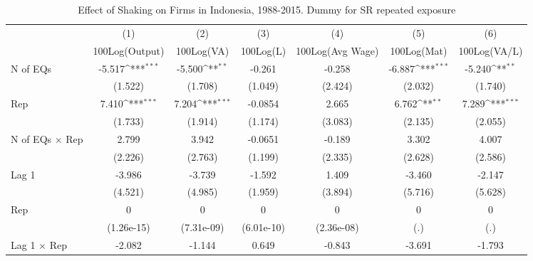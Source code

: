 \begin{table}[htbp]\centering
\def\sym#1{\ifmmode^{#1}\else\(^{#1}\)\fi}
\caption{Effect of Shaking on Firms in Indonesia, 1988-2015. Dummy for SR repeated exposure}
\begin{tabular}{l*{6}{c}}
\toprule
                &\multicolumn{1}{c}{(1)}&\multicolumn{1}{c}{(2)}&\multicolumn{1}{c}{(3)}&\multicolumn{1}{c}{(4)}&\multicolumn{1}{c}{(5)}&\multicolumn{1}{c}{(6)}\\
                &\multicolumn{1}{c}{100Log(Output)}&\multicolumn{1}{c}{100Log(VA)}&\multicolumn{1}{c}{100Log(L)}&\multicolumn{1}{c}{100Log(Avg Wage)}&\multicolumn{1}{c}{100Log(Mat)}&\multicolumn{1}{c}{100Log(VA/L)}\\
\midrule
N of EQs        &   -5.517\sym{***}&   -5.500\sym{**} &   -0.261         &   -0.258         &   -6.887\sym{***}&   -5.240\sym{**} \\
                &  (1.522)         &  (1.708)         &  (1.049)         &  (2.424)         &  (2.032)         &  (1.740)         \\
\addlinespace
Rep             &    7.410\sym{***}&    7.204\sym{***}&  -0.0854         &    2.665         &    6.762\sym{**} &    7.289\sym{***}\\
                &  (1.733)         &  (1.914)         &  (1.174)         &  (3.083)         &  (2.135)         &  (2.055)         \\
\addlinespace
N of EQs $\times$ Rep&    2.799         &    3.942         &  -0.0651         &   -0.189         &    3.302         &    4.007         \\
                &  (2.226)         &  (2.763)         &  (1.199)         &  (2.335)         &  (2.628)         &  (2.586)         \\
\addlinespace
Lag 1           &   -3.986         &   -3.739         &   -1.592         &    1.409         &   -3.460         &   -2.147         \\
                &  (4.521)         &  (4.985)         &  (1.959)         &  (3.894)         &  (5.716)         &  (5.628)         \\
\addlinespace
Rep             &        0         &        0         &        0         &        0         &        0         &        0         \\
                &(1.26e-15)         &(7.31e-09)         &(6.01e-10)         &(2.36e-08)         &      (.)         &      (.)         \\
\addlinespace
Lag 1 $\times$ Rep&   -2.082         &   -1.144         &    0.649         &   -0.843         &   -3.691         &   -1.793         \\

\end{tabular}
\end{table}
